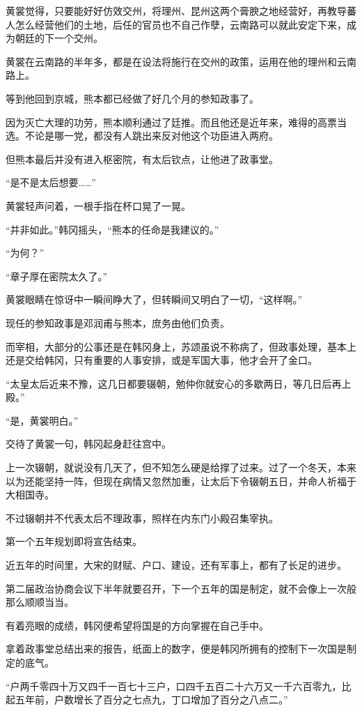 黄裳觉得，只要能好好仿效交州，将理州、昆州这两个膏腴之地经营好，再教导蕃人怎么经营他们的土地，后任的官员也不自己作孽，云南路可以就此安定下来，成为朝廷的下一个交州。

黄裳在云南路的半年多，都是在设法将施行在交州的政策，运用在他的理州和云南路上。

等到他回到京城，熊本都已经做了好几个月的参知政事了。

因为灭亡大理的功劳，熊本顺利通过了廷推。而且他还是近年来，难得的高票当选。不论是哪一党，都没有人跳出来反对他这个功臣进入两府。

但熊本最后并没有进入枢密院，有太后钦点，让他进了政事堂。

“是不是太后想要……”

黄裳轻声问着，一根手指在杯口晃了一晃。

“并非如此。”韩冈摇头，“熊本的任命是我建议的。”

“为何？”

“章子厚在密院太久了。”

黄裳眼睛在惊讶中一瞬间睁大了，但转瞬间又明白了一切，“这样啊。”

现任的参知政事是邓润甫与熊本，庶务由他们负责。

而宰相，大部分的公事还是在韩冈身上，苏颂虽说不称病了，但政事处理，基本上还是交给韩冈，只有重要的人事安排，或是军国大事，他才会开了金口。

“太皇太后近来不豫，这几日都要辍朝，勉仲你就安心的多歇两日，等几日后再上殿。”

“是，黄裳明白。”

交待了黄裳一句，韩冈起身赶往宫中。

上一次辍朝，就说没有几天了，但不知怎么硬是给撑了过来。过了一个冬天，本来以为还能坚持一阵，但现在病情又忽然加重，让太后下令辍朝五日，并命人祈福于大相国寺。

不过辍朝并不代表太后不理政事，照样在内东门小殿召集宰执。

第一个五年规划即将宣告结束。

近五年的时间里，大宋的财赋、户口、建设，还有军事上，都有了长足的进步。

第二届政治协商会议下半年就要召开，下一个五年的国是制定，就不会像上一次般那么顺顺当当。

有着亮眼的成绩，韩冈便希望将国是的方向掌握在自己手中。

拿着政事堂总结出来的报告，纸面上的数字，便是韩冈所拥有的控制下一次国是制定的底气。

“户两千零四十万又四千一百七十三户，口四千五百二十六万又一千六百零九，比起五年前，户数增长了百分之七点九，丁口增加了百分之八点二。”

